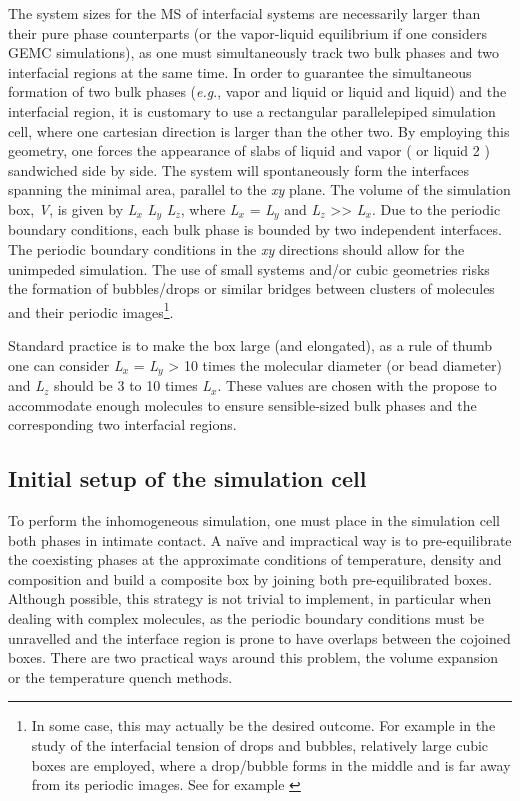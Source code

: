 \documentclass[9pt,bestpractices]{livecoms}
\begin{document}
The system sizes for the MS of interfacial systems are necessarily larger than
their pure phase counterparts (or the vapor-liquid equilibrium if one considers
GEMC simulations), as one must simultaneously track two bulk phases and two
interfacial regions at the same time. In order to guarantee the simultaneous
formation of two bulk phases (\textit{e.g}., vapor and liquid or liquid and
liquid) and the interfacial region, it is customary to use a rectangular
parallelepiped simulation cell, where one cartesian direction is larger than
the other two. By employing this geometry, one forces the appearance of slabs
of liquid and vapor ( or liquid 2 ) sandwiched side by side. The system will
spontaneously form the interfaces spanning the minimal area, parallel to the
\textit{xy} plane. The volume of the simulation box, \textit{V}, is given by
\textit{L}$_{x}$ \textit{L}$_{y}$ \textit{L}$_{z}$, where \textit{L}$_{x}$
= \textit{L}$_{y}$ and \textit{L}$_{z}$ {\textgreater}{\textgreater}
\textit{L}$_{x}$. Due to the periodic boundary conditions, each bulk phase is
bounded by two independent interfaces. The periodic boundary conditions in the
\textit{xy} directions should allow for the unimpeded simulation. The use of
small systems and/or cubic geometries risks the formation of bubbles/drops or
similar bridges between clusters of molecules and their periodic
images\footnote{In some case, this may actually be the desired outcome.
For example in the study of the interfacial tension of drops and bubbles,
relatively large cubic boxes are employed, where a drop/bubble forms in the
middle and is far away from its periodic images. See for example \citep{lau2015}}.

Standard practice is to make the box large (and elongated), as a rule of thumb one can consider
\textit{L}$_{x}$ = \textit{L}$_{y}$ {\textgreater} 10 times the molecular
diameter (or bead diameter) and \textit{L}$_{z}$ should be 3 to 10 times
\textit{L}$_{x}$. These values are chosen with the propose to accommodate
enough molecules to ensure sensible-sized bulk phases and the corresponding two
interfacial regions. 

\subsection{Initial setup of the simulation cell}

To perform the inhomogeneous simulation, one must place in the simulation cell
both phases in intimate contact. A na\"{i}ve and impractical way is to
pre-equilibrate the coexisting phases at the approximate conditions of
temperature, density and composition and build a composite box by joining both
pre-equilibrated boxes. Although possible, this strategy is not trivial to
implement, in particular when dealing with complex molecules, as the periodic
boundary conditions must be unravelled and the interface region is prone to
have overlaps between the cojoined boxes. There are two practical ways around
this problem, the volume expansion or the temperature quench methods. 
\end{document}
